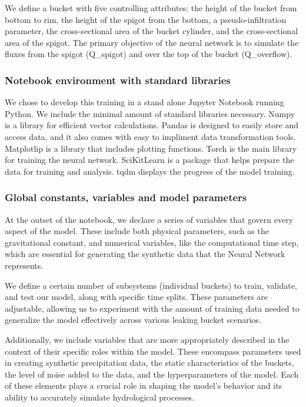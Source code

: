 \documentclass{article}
\begin{document}
We define a bucket with five controlling attributes: the height of the bucket from bottom to rim, the height of the spigot from the bottom, a pseudo-infiltration parameter, the cross-sectional area of the bucket cylinder, and the cross-sectional area of the spigot. The primary objective of the neural network is to simulate the fluxes from the spigot  (Q\_spigot) and over the top of the bucket (Q\_overflow).

\subsubsection{Notebook environment with standard libraries}
We chose to develop this training in a stand alone Jupyter Notebook running Python. We include the minimal amount of standard libraries necessary. Numpy is a library for efficient vector calculations. Pandas is designed to easily store and access data, and it also comes with easy to impliment data transformation tools.
Matplotlip is a library that includes plotting functions. Torch is the main library for training the neural network. SciKitLearn is a package that helps prepare the data for training and analysis. tqdm displays the progress of the model training.

\subsubsection{Global constants, variables and model parameters}
\label{methods:parameters}
At the outset of the notebook, we declare a series of variables that govern every aspect of the model. These include both physical parameters, such as the gravitational constant, and numerical variables, like the computational time step, which are essential for generating the synthetic data that the Neural Network represents.

We define a certain number of subsystems (individual buckets) to train, validate, and test our model, along with specific time splits. These parameters are adjustable, allowing us to experiment with the amount of training data needed to generalize the model effectively across various leaking bucket scenarios.

Additionally, we include variables that are more appropriately described in the context of their specific roles within the model. These encompass parameters used in creating synthetic precipitation data, the static characteristics of the buckets, the level of noise added to the data, and the hyperparameters of the model. Each of these elements plays a crucial role in shaping the model's behavior and its ability to accurately simulate hydrological processes.
\end{document}
